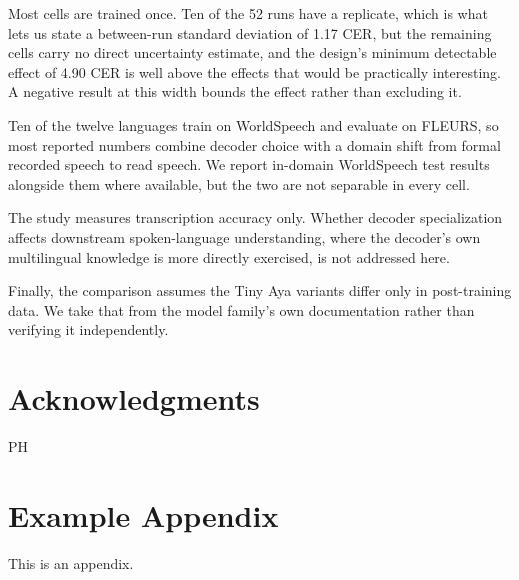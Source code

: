 \documentclass[11pt]{article}
\begin{document}

Most cells are trained once. Ten of the 52 runs have a replicate, which is what lets us state a
between-run standard deviation of 1.17 CER, but the remaining cells carry no direct uncertainty
estimate, and the design's minimum detectable effect of 4.90 CER is well above the effects that
would be practically interesting. A negative result at this width bounds the effect rather than
excluding it.

Ten of the twelve languages train on WorldSpeech and evaluate on FLEURS, so most reported numbers
combine decoder choice with a domain shift from formal recorded speech to read speech. We report
in-domain WorldSpeech test results alongside them where available, but the two are not
separable in every cell.

The study measures transcription accuracy only. Whether decoder specialization affects
downstream spoken-language understanding, where the decoder's own multilingual knowledge is more
directly exercised, is not addressed here.

Finally, the comparison assumes the Tiny Aya variants differ only in post-training data. We take
that from the model family's own documentation rather than verifying it independently.


\section*{Acknowledgments}

PH

%

%

\appendix

\section{Example Appendix}
\label{sec:appendix}

This is an appendix.
\end{document}
